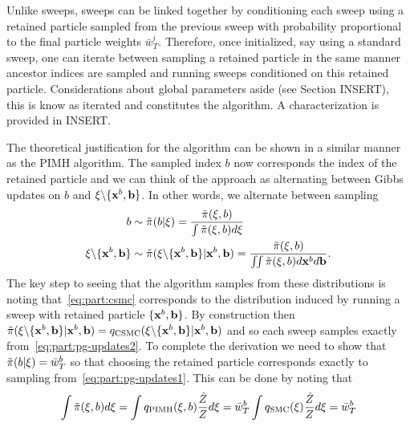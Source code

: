 Unlike \smc sweeps, \csmc sweeps can be linked together by conditioning each sweep using a retained particle
sampled from the previous sweep with probability proportional to the final particle weights $\bar{w}^i_T$.
Therefore, once initialized, say using a standard \smc sweep, one can iterate between sampling a retained
particle in the same manner ancestor indices are sampled and running \csmc sweeps conditioned on this
retained particle.  Considerations about global parameters aside (see Section INSERT), this is know
as iterated \csmc and constitutes the \pg algorithm.  A characterization is provided in INSERT. 


The theoretical justification for the \pg algorithm can be shown in a similar manner as the PIMH algorithm.
The sampled index $b$ now corresponds the index of the retained particle and we can think of the
approach as alternating between Gibbs updates on $b$ and $\mathbf{\xi} \backslash \{\mathbf{x}^b,\mathbf{b}\}$.    In other
words, we alternate between sampling 
\begin{subequations}
	\label{eq:part:pg-updates}
	\begin{align}
	b &\sim \tilde{\pi}(b | \mathbf{\xi}) = \frac{\tilde{\pi}(\xi,b)}{\int \tilde{\pi}(\xi,b) d\xi} \label{eq:part:pg-updates1}\\
	\mathbf{\xi} \backslash \{\mathbf{x}^b,\mathbf{b}\} & \sim \tilde{\pi}(\mathbf{\xi} \backslash \{\mathbf{x}^b,\mathbf{b}\}  | \mathbf{x}^b,\mathbf{b}) =
	\frac{\tilde{\pi}(\xi,b)}{\iint \tilde{\pi}(\xi,b) d\mathbf{x}^b d\mathbf{b}}. \label{eq:part:pg-updates2}
		\end{align}
\end{subequations} 
The key step to seeing that the \pg
algorithm samples from these distributions is noting that~\eqref{eq:part:csmc} corresponds to the distribution
induced by running a \csmc sweep with retained particle $\{\mathbf{x}^b,\mathbf{b}\}$.  By construction
then $\tilde{\pi}(\mathbf{\xi} \backslash \{\mathbf{x}^b,\mathbf{b}\}  | \mathbf{x}^b,\mathbf{b}) = q_{\text{CSMC}}(\mathbf{\xi} \backslash \{\mathbf{x}^b,\mathbf{b}\}  | \mathbf{x}^b,\mathbf{b})$
and so each \csmc sweep samples exactly from~\eqref{eq:part:pg-updates2}.  To complete the derivation
we need to show that $\tilde{\pi}(b | \mathbf{\xi}) = \bar{w}_T^b$ so that choosing the retained particle corresponds
exactly to sampling from~\eqref{eq:part:pg-updates1}.    This can be done by noting that
\begin{align}
\int \tilde{\pi}(\xi,b) d\xi = \int q_{\text{PIMH}}(\mathbf{\xi},b) \frac{\hat{Z}}{Z} d\xi = \bar{w}_T^b
\int q_{\text{SMC}}(\mathbf{\xi}) \frac{\hat{Z}}{Z} d\xi = \bar{w}_T^b
\end{align}
